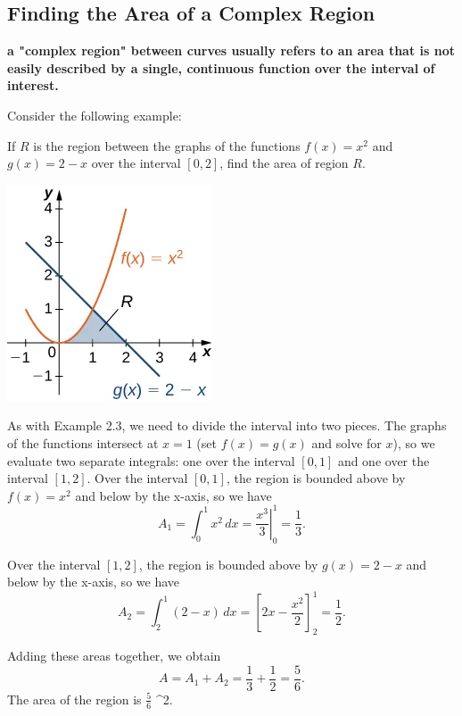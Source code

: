 \documentclass{report}
\begin{document}
    \subsection*{Finding the Area of a Complex Region}
    \smallbreak \noindent
    \begin{definition}
    \textbf{a "complex region" between curves usually refers to an area that is not easily described by a single, continuous function over the interval of interest.} 
    \end{definition}
    \bigbreak \noindent 
    Consider the following example:
    \smallbreak \noindent
    \begin{eg}
        If \( R \) is the region between the graphs of the functions \( f(x) = x^{2} \) and \( g(x) = 2-x \) over the interval \([0, 2]\), find the area of region \( R \).
    \end{eg}
    \bigbreak \noindent 
    \begin{minipage}{0.47\textwidth}
        \begin{center}
            \includegraphics[scale=0.7]{ ./figures/graph4.png }
        \end{center}
    \end{minipage}
    \begin{minipage}{0.47\textwidth}
        As with Example 2.3, we need to divide the interval into two pieces. The graphs of the functions intersect at \( x=1 \) (set \( f(x)=g(x) \) and solve for \( x \)), so we evaluate two separate integrals: one over the interval \([0,1]\) and one over the interval \([1,2]\).
        \bigbreak \noindent 
        Over the interval \([0,1]\), the region is bounded above by \( f(x)=x^2 \) and below by the x-axis, so we have
        \[
        A_1 = \int_{0}^{1} x^2 \, dx = \left. \frac{x^3}{3} \right|_{0}^{1} = \frac{1}{3}.
        \]

        Over the interval \([1,2]\), the region is bounded above by \( g(x)=2-x \) and below by the x-axis, so we have
        \[
        A_2 = \int_{2}^{1} (2-x) \, dx = \left[ 2x - \frac{x^2}{2} \right]_{2}^{1} = \frac{1}{2}.
        \]

        Adding these areas together, we obtain
        \[
        A = A_1 + A_2 = \frac{1}{3} + \frac{1}{2} = \frac{5}{6}.
        \]
        The area of the region is \( \frac{5}{6} \) ^2.
    \end{minipage}
    


    
\end{document}
